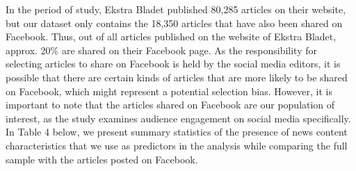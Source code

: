 \documentclass[
]{article}
\begin{document}
\noindent In the period of study, Ekstra Bladet published 80,285
articles on their website, but our dataset only contains the 18,350
articles that have also been shared on Facebook. Thus, out of all
articles published on the website of Ekstra Bladet, approx. 20\% are
shared on their Facebook page. As the responsibility for selecting
articles to share on Facebook is held by the social media editors, it is
possible that there are certain kinds of articles that are more likely
to be shared on Facebook, which might represent a potential selection
bias. However, it is important to note that the articles shared on
Facebook are our population of interest, as the study examines audience
engagement on social media specifically. In Table 4 below, we present
summary statistics of the presence of news content characteristics that
we use as predictors in the analysis while comparing the full sample
with the articles posted on Facebook.
\end{document}

